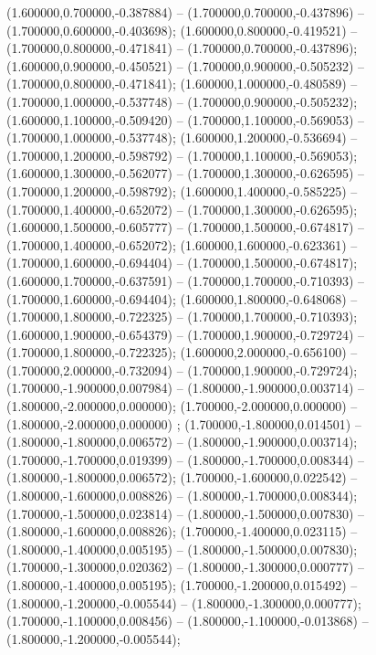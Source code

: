  (1.600000,0.700000,-0.387884) -- (1.700000,0.700000,-0.437896) -- (1.700000,0.600000,-0.403698);
 (1.600000,0.800000,-0.419521) -- (1.700000,0.800000,-0.471841) -- (1.700000,0.700000,-0.437896);
 (1.600000,0.900000,-0.450521) -- (1.700000,0.900000,-0.505232) -- (1.700000,0.800000,-0.471841);
 (1.600000,1.000000,-0.480589) -- (1.700000,1.000000,-0.537748) -- (1.700000,0.900000,-0.505232);
 (1.600000,1.100000,-0.509420) -- (1.700000,1.100000,-0.569053) -- (1.700000,1.000000,-0.537748);
 (1.600000,1.200000,-0.536694) -- (1.700000,1.200000,-0.598792) -- (1.700000,1.100000,-0.569053);
 (1.600000,1.300000,-0.562077) -- (1.700000,1.300000,-0.626595) -- (1.700000,1.200000,-0.598792);
 (1.600000,1.400000,-0.585225) -- (1.700000,1.400000,-0.652072) -- (1.700000,1.300000,-0.626595);
 (1.600000,1.500000,-0.605777) -- (1.700000,1.500000,-0.674817) -- (1.700000,1.400000,-0.652072);
 (1.600000,1.600000,-0.623361) -- (1.700000,1.600000,-0.694404) -- (1.700000,1.500000,-0.674817);
 (1.600000,1.700000,-0.637591) -- (1.700000,1.700000,-0.710393) -- (1.700000,1.600000,-0.694404);
 (1.600000,1.800000,-0.648068) -- (1.700000,1.800000,-0.722325) -- (1.700000,1.700000,-0.710393);
 (1.600000,1.900000,-0.654379) -- (1.700000,1.900000,-0.729724) -- (1.700000,1.800000,-0.722325);
 (1.600000,2.000000,-0.656100) -- (1.700000,2.000000,-0.732094) -- (1.700000,1.900000,-0.729724);
 (1.700000,-1.900000,0.007984) -- (1.800000,-1.900000,0.003714) -- (1.800000,-2.000000,0.000000);
 (1.700000,-2.000000,0.000000) -- (1.800000,-2.000000,0.000000) ;
 (1.700000,-1.800000,0.014501) -- (1.800000,-1.800000,0.006572) -- (1.800000,-1.900000,0.003714);
 (1.700000,-1.700000,0.019399) -- (1.800000,-1.700000,0.008344) -- (1.800000,-1.800000,0.006572);
 (1.700000,-1.600000,0.022542) -- (1.800000,-1.600000,0.008826) -- (1.800000,-1.700000,0.008344);
 (1.700000,-1.500000,0.023814) -- (1.800000,-1.500000,0.007830) -- (1.800000,-1.600000,0.008826);
 (1.700000,-1.400000,0.023115) -- (1.800000,-1.400000,0.005195) -- (1.800000,-1.500000,0.007830);
 (1.700000,-1.300000,0.020362) -- (1.800000,-1.300000,0.000777) -- (1.800000,-1.400000,0.005195);
 (1.700000,-1.200000,0.015492) -- (1.800000,-1.200000,-0.005544) -- (1.800000,-1.300000,0.000777);
 (1.700000,-1.100000,0.008456) -- (1.800000,-1.100000,-0.013868) -- (1.800000,-1.200000,-0.005544);
